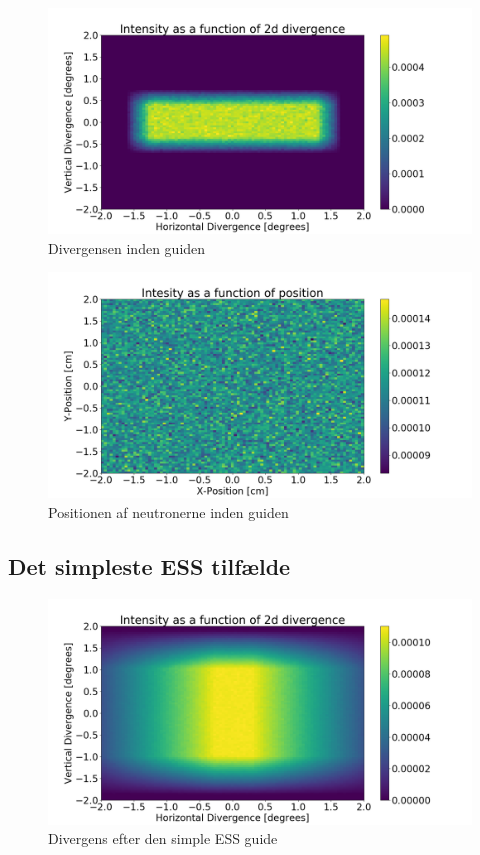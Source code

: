 \documentclass[12pt,oneside,a4paper]{article}
\begin{document}
{{{{{\begin{figure}[H]
\centering
\includegraphics[width=1\textwidth]{div_straight_before.png}
\caption{Divergensen inden guiden}
\end{figure}

\begin{figure}[H]
\centering
\includegraphics[width=1\textwidth]{psd_straight_before.png}
\caption{Positionen af neutronerne inden guiden}
\end{figure}



\subsection{Det simpleste ESS tilfælde}

\begin{figure}[H]
\centering
\includegraphics[width=1\textwidth]{div_ess_simple_after.png}
\caption{Divergens efter den simple ESS guide}
\end{figure}


}}}}}
\end{document}
